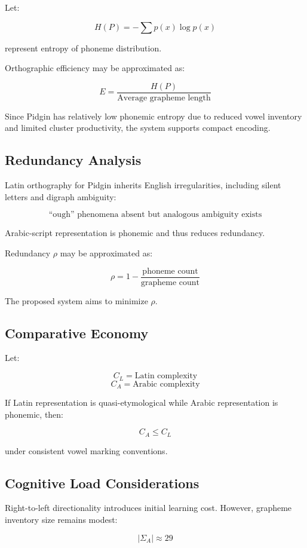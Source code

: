 \documentclass[12pt]{article}
\begin{document}
Let:

\[
H(P) = -\sum p(x)\log p(x)
\]

represent entropy of phoneme distribution.

Orthographic efficiency may be approximated as:

\[
E = \frac{H(P)}{\text{Average grapheme length}}
\]

Since Pidgin has relatively low phonemic entropy due to reduced vowel inventory and limited cluster productivity, the system supports compact encoding.

\subsection{Redundancy Analysis}

Latin orthography for Pidgin inherits English irregularities, including silent letters and digraph ambiguity:

\[
\text{“ough” phenomena absent but analogous ambiguity exists}
\]

Arabic-script representation is phonemic and thus reduces redundancy.

Redundancy \( \rho \) may be approximated as:

\[
\rho = 1 - \frac{\text{phoneme count}}{\text{grapheme count}}
\]

The proposed system aims to minimize \( \rho \).

\subsection{Comparative Economy}

Let:

\[
C_L = \text{Latin complexity}
\]
\[
C_A = \text{Arabic complexity}
\]

If Latin representation is quasi-etymological while Arabic representation is phonemic, then:

\[
C_A \leq C_L
\]

under consistent vowel marking conventions.

\subsection{Cognitive Load Considerations}

Right-to-left directionality introduces initial learning cost. However, grapheme inventory size remains modest:

\[
|\Sigma_A| \approx 29
\]
\end{document}
